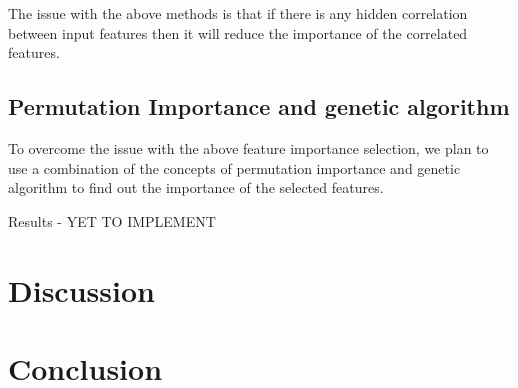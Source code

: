\documentclass[11pt]{article}
\begin{document}
The issue with the above methods is that if there is any hidden correlation between input features then it will reduce the importance of the correlated features.

\subsection{Permutation Importance and genetic algorithm}
To overcome the issue with the above feature importance selection, we plan to use a combination of the concepts of permutation importance and genetic algorithm to find out the importance of the selected features.

Results - YET TO IMPLEMENT

\section{Discussion}


\section{Conclusion}



\end{document}
